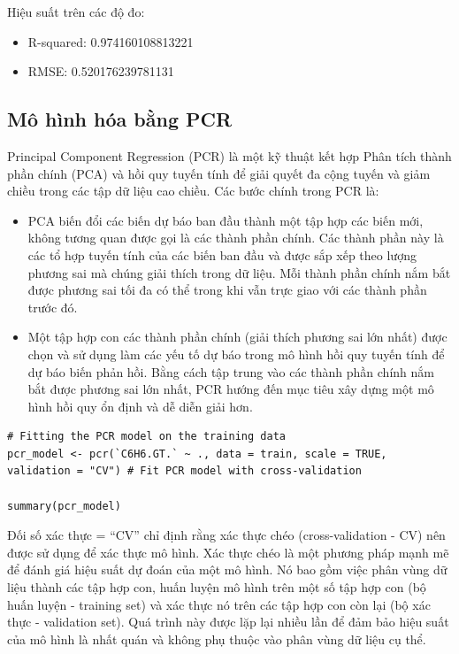 Hiệu suất trên các độ đo:
\begin{itemize}
    \item R-squared: 0.974160108813221
    \item RMSE:  0.520176239781131
\end{itemize}


\subsection{Mô hình hóa bằng PCR}

Principal Component Regression (PCR) là một kỹ thuật kết hợp Phân tích thành phần chính (PCA) và hồi quy tuyến tính để giải quyết đa cộng tuyến và giảm chiều trong các tập dữ liệu cao chiều. Các bước chính trong PCR là:
\begin{itemize}
    \item PCA biến đổi các biến dự báo ban đầu thành một tập hợp các biến mới, không tương quan được gọi là các thành phần chính. Các thành phần này là các tổ hợp tuyến tính của các biến ban đầu và được sắp xếp theo lượng phương sai mà chúng giải thích trong dữ liệu. Mỗi thành phần chính nắm bắt được phương sai tối đa có thể trong khi vẫn trực giao với các thành phần trước đó.
    \item Một tập hợp con các thành phần chính (giải thích phương sai lớn nhất) được chọn và sử dụng làm các yếu tố dự báo trong mô hình hồi quy tuyến tính để dự báo biến phản hồi. Bằng cách tập trung vào các thành phần chính nắm bắt được phương sai lớn nhất, PCR hướng đến mục tiêu xây dựng một mô hình hồi quy ổn định và dễ diễn giải hơn.
\end{itemize}

\begin{lstlisting}
# Fitting the PCR model on the training data
pcr_model <- pcr(`C6H6.GT.` ~ ., data = train, scale = TRUE, validation = "CV") # Fit PCR model with cross-validation

summary(pcr_model)
\end{lstlisting}

Đối số xác thực = “CV” chỉ định rằng xác thực chéo (cross-validation - CV) nên được sử dụng để xác thực mô hình. Xác thực chéo là một phương pháp mạnh mẽ để đánh giá hiệu suất dự đoán của một mô hình. Nó bao gồm việc phân vùng dữ liệu thành các tập hợp con, huấn luyện mô hình trên một số tập hợp con (bộ huấn luyện - training set) và xác thực nó trên các tập hợp con còn lại (bộ xác thực - validation set). Quá trình này được lặp lại nhiều lần để đảm bảo hiệu suất của mô hình là nhất quán và không phụ thuộc vào phân vùng dữ liệu cụ thể.

